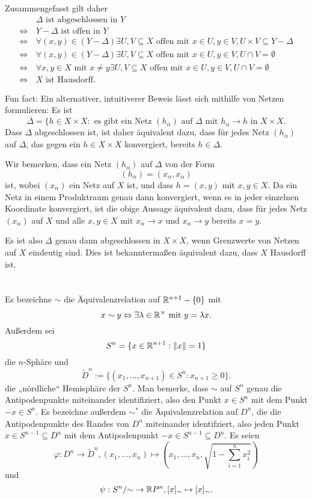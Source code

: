 \documentclass[a4paper,10pt]{article}
\begin{document}
Zusammengefasst gilt daher
\begin{align*}
                &\, \Delta \text{ ist abgeschlossen in } Y \\
 \Leftrightarrow&\, Y-\Delta \text{ ist offen in } Y \\
 \Leftrightarrow&\, \forall (x,y) \in (Y-\Delta) \exists U,V \subseteq X \text{ offen mit } x \in U, y \in V, U \times V \subseteq Y-\Delta \\
 \Leftrightarrow&\, \forall (x,y) \in (Y-\Delta) \exists U,V \subseteq X \text{ offen mit } x \in U, y \in V, U \cap V = \emptyset \\
 \Leftrightarrow&\, \forall x,y \in X \text{ mit } x \neq y \exists U,V \subseteq X \text{ offen mit } x \in U, y \in V, U \cap V = \emptyset \\
 \Leftrightarrow&\, X \text{ ist Hausdorff.}
\end{align*}

Fun fact: Ein alternativer, intuitiverer Beweis lässt sich mithilfe von Netzen formulieren: Es ist
\[
 \overline{\Delta} = \{h \in X \times X : \text{ es gibt ein Netz $(h_\alpha)$ auf $\Delta$ mit $h_\alpha \to h$ in $X \times X$}.
\]
Dass $\Delta$ abgeschlossen ist, ist daher äquivalent dazu, dass für jedes Netz $(h_\alpha)$ auf $\Delta$, das gegen ein $h \in X \times X$ konvergiert, bereits $h \in \Delta$.

Wir bemerken, dass ein Netz $(h_\alpha)$ auf $\Delta$ von der Form
\[
 (h_\alpha) = (x_\alpha, x_\alpha)
\]
ist, wobei $(x_\alpha)$ ein Netz auf $X$ ist, und dass $h = (x,y)$ mit $x,y \in X$. Da ein Netz in einem Produktraum genau dann konvergiert, wenn es in jeder einzelnen Koordinate konvergiert, ist die obige Aussage äquivalent dazu, dass für jedes Netz $(x_\alpha)$ auf $X$ und alle $x,y \in X$ mit $x_\alpha \to x$ und $x_\alpha \to y$ bereits $x = y$.

Es ist also $\Delta$ genau dann abgeschlossen in $X \times X$, wenn Grenzwerte von Netzen auf $X$ eindeutig sind. Dies ist bekanntermaßen äquivalent dazu, dass $X$ Hausdorff ist.





\section{}
Es bezeichne $\sim$ die Äquivalenzrelation auf $\mathbb{R}^{n+1} - \{0\}$ mit
\[
 x \sim y \Leftrightarrow \exists \lambda \in \mathbb{R}^\times \text{ mit } y = \lambda x.
\]
Außerdem sei
\[
 S^n = \{x \in \mathbb{R}^{n+1} : \|x\|=1\}
\]
die $n$-Sphäre und
\[
 \tilde{D}^n := \{(x_1, \ldots, x_{n+1}) \in S^n : x_{n+1} \geq 0\}.
\]
die „nördliche“ Hemisphäre der $S^n$. Man bemerke, dass $\sim$ auf $S^n$ genau die Antipodenpunkte miteinander identifiziert, also den Punkt $x \in S^n$ mit dem Punkt $-x \in S^n$.
Es bezeichne außerdem $\sim^*$ die Äquivalenzrelation auf $D^n$, die die Antipodenpunkte des Randes von $D^n$ miteinander identifziert, also jeden Punkt $x \in S^{n-1} \subseteq D^n$ mit dem Antipodenpunkt $-x \in S^{n-1} \subseteq D^n$. Es seien
\[
 \varphi : D^n \to \tilde{D}^n, (x_1, \ldots, x_n) \mapsto \left(x_1, \ldots, x_n, \sqrt{1-\sum_{i=1}^n x_i^2}\right)
\]
und
\[
 \psi : S^n/{\sim} \to \mathbb{R} P^n, [x]_\sim \mapsto [x]_\sim.
\]
\end{document}
